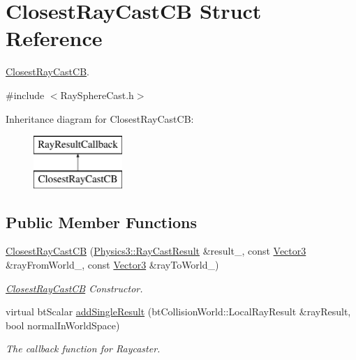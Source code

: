 \hypertarget{struct_closest_ray_cast_c_b}{}\section{Closest\+Ray\+Cast\+CB Struct Reference}
\label{struct_closest_ray_cast_c_b}


\hyperlink{struct_closest_ray_cast_c_b}{Closest\+Ray\+Cast\+CB}.  




{\ttfamily \#include $<$Ray\+Sphere\+Cast.\+h$>$}

Inheritance diagram for Closest\+Ray\+Cast\+CB\+:\begin{figure}[H]
\begin{center}
\leavevmode
\includegraphics[height=2.000000cm]{struct_closest_ray_cast_c_b}
\end{center}
\end{figure}
\subsection*{Public Member Functions}
\begin{DoxyCompactItemize}
\item 
\hyperlink{struct_closest_ray_cast_c_b_a2d80260a6655d5b23a87c3473f0ea2e6}{Closest\+Ray\+Cast\+CB} (\hyperlink{class_magnum_1_1_physics3_1_1_ray_cast_result}{Physics3\+::\+Ray\+Cast\+Result} \&result\+\_\+, const \hyperlink{class_magnum_1_1_vector3}{Vector3} \&ray\+From\+World\+\_\+, const \hyperlink{class_magnum_1_1_vector3}{Vector3} \&ray\+To\+World\+\_\+)
\begin{DoxyCompactList}\small\item\em \hyperlink{struct_closest_ray_cast_c_b}{Closest\+Ray\+Cast\+CB} Constructor. \end{DoxyCompactList}\item 
virtual bt\+Scalar \hyperlink{struct_closest_ray_cast_c_b_a644986e5dc6766853d4f95c075a48cb0}{add\+Single\+Result} (bt\+Collision\+World\+::\+Local\+Ray\+Result \&ray\+Result, bool normal\+In\+World\+Space)
\begin{DoxyCompactList}\small\item\em The callback function for Raycaster. \end{DoxyCompactList}\end{DoxyCompactItemize}
